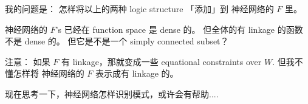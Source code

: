 \documentclass[orivec]{llncs}
\makeatletter
\newcommand{\emp}[1]{\textbf{\textcolor{Cerulean}{#1}}}
\newcommand{\vect}[1]{\boldsymbol{#1}}
\renewcommand{\boxed}[1]{\fbox{\m@th$\displaystyle\scalebox{0.9}{#1}$} \,}
\makeatother
\begin{document}
我的问题是： 怎样将以上的两种 logic structure 「添加」到 神经网络的 $F$ 里。 

神经网络的 $F$'s 已经在 function space 是 dense 的。  但全体的有 linkage 的函数不是 dense 的。  但它是不是一个 simply connected subset？

注意： 如果 $F$ 有 linkage，那就变成一些 equational constraints over $W$.   但我不懂怎样将 神经网络的 $F$ 表示成有 linkage 的。






现在思考一下，神经网络怎样识别模式，或许会有帮助....
\end{document}
